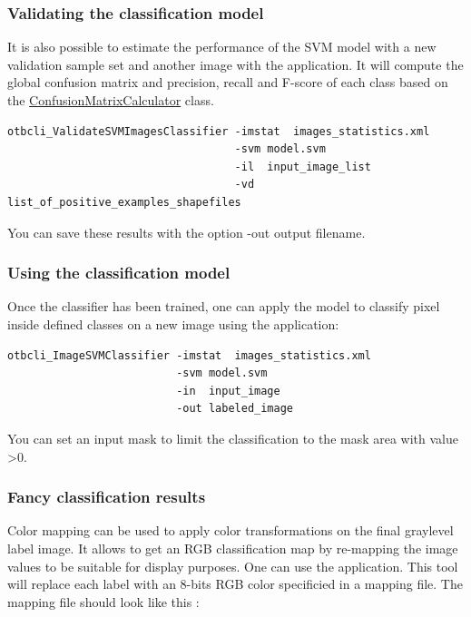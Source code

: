 \subsubsection{Validating the classification model}
It is also possible to estimate the performance of the SVM model with a
new validation sample set and another image with the
 application. It will compute
the global confusion matrix and precision, recall and F-score of each
class based on the \href{http://www.orfeo-toolbox.org/doxygen-current/classotb_1_1ConfusionMatrixCalculator.html}{ConfusionMatrixCalculator}
class.

\begin{verbatim}
otbcli_ValidateSVMImagesClassifier -imstat  images_statistics.xml
                                   -svm model.svm
                                   -il  input_image_list
                                   -vd  list_of_positive_examples_shapefiles
\end{verbatim}

You can save these results with the option -out output filename.

\subsubsection{Using the classification model}
Once the classifier has been trained, one can apply the model to classify
pixel inside defined classes on a new image using the
 application:

\begin{verbatim}
otbcli_ImageSVMClassifier -imstat  images_statistics.xml
                          -svm model.svm
                          -in  input_image
                          -out labeled_image
\end{verbatim}

You can set an input mask to limit the classification to the mask area with
value \textgreater 0.

\subsubsection{Fancy classification results}

Color mapping can be used to apply color transformations on the final
graylevel label image. It allows to get an RGB classification map
by re-mapping the image values to be suitable for display purposes.
One can use the  application. This tool will
replace each label with an 8-bits RGB color specificied in a mapping
file. The mapping file should look like this :

